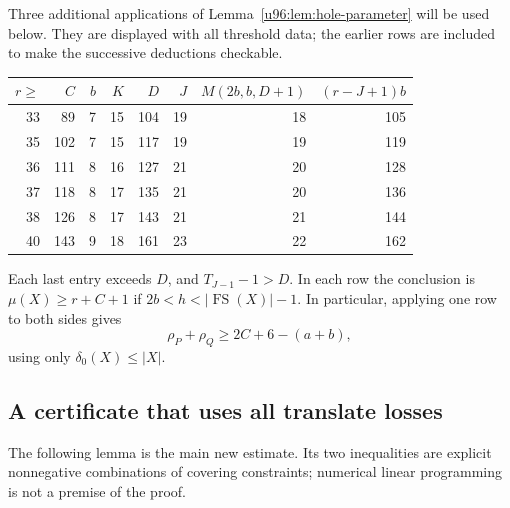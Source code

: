 \documentclass[11pt,a4paper]{article}
\theoremstyle{remark}
\newcommand{\FS}{\operatorname{FS}}
\begin{document}
Three additional applications of Lemma~\ref{u96:lem:hole-parameter} will be
used below. They are displayed with all threshold data; the earlier rows
are included to make the successive deductions checkable.
\begin{center}\small
\begin{tabular}{rrrrrrrr}
\toprule
$r\geq$&$C$&$b$&$K$&$D$&$J$&$M(2b,b,D+1)$&$(r-J+1)b$\\
\midrule
33&89&7&15&104&19&18&105\\
35&102&7&15&117&19&19&119\\
36&111&8&16&127&21&20&128\\
37&118&8&17&135&21&20&136\\
38&126&8&17&143&21&21&144\\
40&143&9&18&161&23&22&162\\
\bottomrule
\end{tabular}
\end{center}
Each last entry exceeds $D$, and $T_{J-1}-1>D$. In each row the conclusion
is $\mu(X)\geq r+C+1$ if $2b<h<|\FS(X)|-1$. In particular, applying one
row to both sides gives
\begin{equation}
 \rho_P+\rho_Q\geq2C+6-(a+b),\label{u96:eq:two-hole-penalty}
\end{equation}
using only $\delta_0(X)\leq|X|$.

\subsection{A certificate that uses all translate losses}
The following lemma is the main new estimate. Its two inequalities are
explicit nonnegative combinations of covering constraints; numerical
linear programming is not a premise of the proof.
\end{document}
